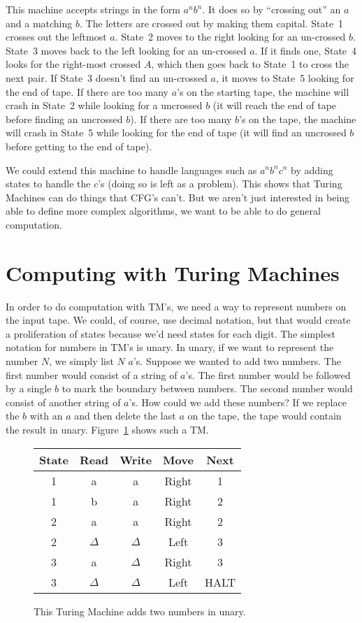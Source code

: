 \documentclass[letterpaper,12pt,openany,reqno]{book}%
\begin{document}
This machine accepts strings in the form $a^nb^n$. It does so by ``crossing out'' an $a$ and a matching $b$. The letters are crossed out by making them capital. State~1 crosses out the leftmost $a$. State~2 moves to the right looking for an un-crossed $b$. State~3 moves back to the left looking for an un-crossed $a$. If it finds one, State~4 looks for the right-most crossed $A$, which then goes back to State~1 to cross the next pair. If State~3 doesn't find an un-crossed $a$, it moves to State~5 looking for the end of tape. If there are too many $a$'s on the starting tape, the machine will crash in State~2 while looking for a uncrossed $b$ (it will reach the end of tape before finding an uncrossed $b$). If there are too many $b$'s on the tape, the machine will crash in State~5 while looking for the end of tape (it will find an uncrossed $b$ before getting to the end of tape).

We could extend this machine to handle languages such as $a^nb^nc^n$ by adding states to handle the $c$'s (doing so is left as a problem). This shows that Turing Machines can do things that CFG's can't. But we aren't just interested in being able to define more complex algorithms, we want to be able to do general computation.

\section{Computing with Turing Machines}
In order to do computation with TM's, we need a way to represent numbers on the input tape. We could, of course, use decimal notation, but that would create a proliferation of states because we'd need states for each digit. The simplest notation for numbers in TM's is unary. In unary, if we want to represent the number $N$, we simply list $N$ $a$'s. Suppose we wanted to add two numbers. The first number would consist of a string of $a$'s. The first number would be followed by a single $b$ to mark the boundary between numbers. The second number would consist of another string of $a$'s. How could we add these numbers? If we replace the $b$ with an $a$ and then delete the last $a$ on the tape, the tape would contain the result in unary. Figure~\ref{F.TM.add} shows such a TM.
\begin{figure}[hbt]
\centering
\begin{tabular}{|c|c|c|c|c|}
\hline
State & Read & Write & Move & Next \\
\hline
1 & a & a & Right & 1 \\
\hline
1 & b & a & Right & 2 \\
\hline
2 & a & a & Right & 2 \\
\hline
2 & $\Delta$ & $\Delta$ & Left & 3 \\
\hline
3 & a & $\Delta$ & Right & 3 \\
\hline
3 & $\Delta$ & $\Delta$ & Left & HALT \\
\hline
\end{tabular}
\caption[Turing Machine for adding]{This Turing Machine adds two numbers in unary.}
\label{F.TM.add}
\end{figure}
\end{document}
